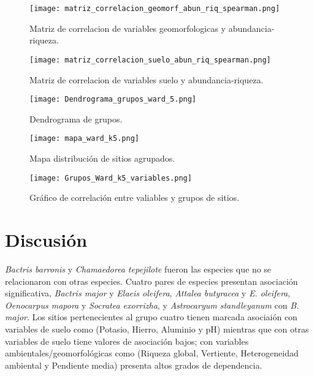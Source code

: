 \documentclass[11pt,]{article}
\begin{document}
\begin{figure}
\centering
\texttt{[image: matriz\_correlacion\_geomorf\_abun\_riq\_spearman.png]}
\caption{Matriz de correlacion de variables geomorfologicas y
abundancia-riqueza.
\label{fig:matriz_correlacion_geomorf_abun_riq_spearman}}
\end{figure}

\begin{figure}
\centering
\texttt{[image: matriz\_correlacion\_suelo\_abun\_riq\_spearman.png]}
\caption{Matriz de correlacion de variables suelo y abundancia-riqueza.
\label{fig:matriz_correlacion_suelo_abun_riq_spearman}}
\end{figure}

\begin{figure}
\centering
\texttt{[image: Dendrograma\_grupos\_ward\_5.png]}
\caption{Dendrograma de grupos. \label{fig:Dendrograma_grupos_ward_5}}
\end{figure}

\begin{figure}
\centering
\texttt{[image: mapa\_ward\_k5.png]}
\caption{Mapa distribución de sitios agrupados.
\label{fig:mapa_ward_k5}}
\end{figure}

\begin{figure}
\centering
\texttt{[image: Grupos\_Ward\_k5\_variables.png]}
\caption{Gráfico de correlación entre valiables y grupos de sitios.
\label{fig:Grupos_Ward_k5_variables}}
\end{figure}

\section{Discusión}\label{discusiuxf3n}

\emph{Bactris barronis} y \emph{Chamaedorea tepejilote} fueron las
especies que no se relacionaron con otras especies. Cuatro pares de
especies presentan asociación significativa, \emph{Bactris major} y
\emph{Elaeis oleifera}, \emph{Attalea butyracea} y \emph{E. oleifera},
\emph{Oenocarpus mapora} y \emph{Socratea exorrizha}, y
\emph{Astrocaryum standleyanum} con \emph{B. major}. Los sitios
pertenecientes al grupo cuatro tienen marcada asociaión con variables de
suelo como (Potasio, Hierro, Aluminio y pH) mientras que con otras
variables de suelo tiene valores de asociación bajos; con variables
ambientales/geomorfológicas como (Riqueza global, Vertiente,
Heterogeneidad ambiental y Pendiente media) presenta altos grados de
dependencia.
\end{document}
